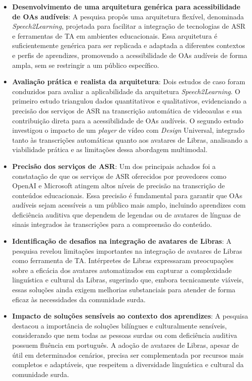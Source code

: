 \begin{itemize}
    \item \textbf{Desenvolvimento de uma arquitetura genérica para acessibilidade de OAs audíveis}: A pesquisa propôs uma arquitetura flexível, denominada \textit{Speech2Learning}, projetada para facilitar a integração de tecnologias de ASR e ferramentas de TA em ambientes educacionais. Essa arquitetura é suficientemente genérica para ser replicada e adaptada a diferentes contextos e perfis de aprendizes, promovendo a acessibilidade de OAs audíveis de forma ampla, sem se restringir a um público específico.

    \item \textbf{Avaliação prática e realista da arquitetura}: Dois estudos de caso foram conduzidos para avaliar a aplicabilidade da arquitetura \textit{Speech2Learning}. O primeiro estudo triangulou dados quantitativos e qualitativos, evidenciando a precisão dos serviços de ASR na transcrição automática de videoaulas e sua contribuição direta para a acessibilidade de OAs audíveis. O segundo estudo investigou o impacto de um \textit{player} de vídeo com \textit{Design} Universal, integrado tanto às transcrições automáticas quanto aos avatares de Libras, analisando a viabilidade prática e as limitações dessa abordagem multimodal.

    \item \textbf{Precisão dos serviços de ASR}: Um dos principais achados foi a constatação de que os serviços de ASR oferecidos por provedores como OpenAI e Microsoft atingem altos níveis de precisão na transcrição de conteúdos educacionais. Essa precisão é fundamental para garantir que OAs audíveis sejam acessíveis a um público mais amplo, incluindo aprendizes com deficiência auditiva que dependem de legendas ou de avatares de línguas de sinais integrados às transcrições para a compreensão do conteúdo.

    \item \textbf{Identificação de desafios na integração de avatares de Libras}: A pesquisa revelou limitações importantes na integração de avatares de Libras como ferramenta de TA. Intérpretes de Libras expressaram preocupações sobre a eficácia dos avatares automatizados em capturar a complexidade linguística e cultural da Libras, sugerindo que, embora tecnicamente viáveis, essas soluções ainda exigem melhorias substanciais para atender de forma eficaz às necessidades da comunidade surda.

    \item \textbf{Impacto de soluções sensíveis ao contexto dos aprendizes}: A pesquisa destacou a importância de soluções bilíngues e culturalmente sensíveis, considerando que nem todas as pessoas surdas ou com deficiência auditiva possuem fluência em português. A adoção de avatares de Libras, apesar de útil em determinados cenários, precisa ser complementada por recursos mais completos e adaptáveis, que respeitem a diversidade linguística e cultural da comunidade surda.


\end{itemize}
